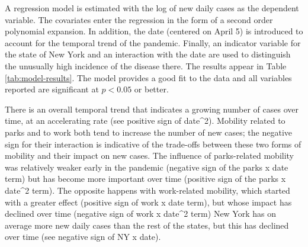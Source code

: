 \documentclass[]{elsarticle} %
\begin{document}
A regression model is estimated with the log of new daily cases as the
dependent variable. The covariates enter the regression in the form of a
second order polynomial expansion. In addition, the date (centered on
April 5) is introduced to account for the temporal trend of the
pandemic. Finally, an indicator variable for the state of New York and
an interaction with the date are used to distinguish the unusually high
incidence of the disease there. The results appear in Table
\ref{tab:model-results}. The model provides a good fit to the data and
all variables reported are significant at \(p<0.05\) or better.

There is an overall temporal trend that indicates a growing number of
cases over time, at an accelerating rate (see positive sign of
date\^{}2). Mobility related to parks and to work both tend to increase
the number of new cases; the negative sign for their interaction is
indicative of the trade-offs between these two forms of mobility and
their impact on new cases. The influence of parks-related mobility was
relatively weaker early in the pandemic (negative sign of the parks x
date term) but has become more important over time (positive sign of the
parks x date\^{}2 term). The opposite happens with work-related
mobility, which started with a greater effect (positive sign of work x
date term), but whose impact has declined over time (negative sign of
work x date\^{}2 term) New York has on average more new daily cases than
the rest of the states, but this has declined over time (see negative
sign of NY x date).
\end{document}
